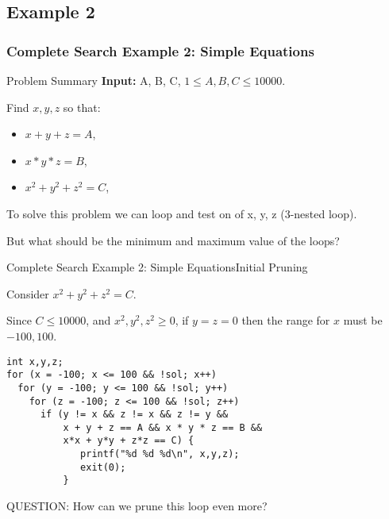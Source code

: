 \subsection{Example 2}
\begin{frame}
  \frametitle{Complete Search Example 2: Simple Equations}
  \begin{block}{Problem Summary}
    {\bf Input:} A, B, C, $1 \leq A,B,C \leq 10000$.\bigskip

    Find $x,y,z$ so that:
    \begin{itemize}
    \item $x+y+z=A$,
    \item $x*y*z=B$,
    \item $x^2+y^2+z^2=C$,
    \end{itemize}

    \bigskip
  \end{block}
  \bigskip

  To solve this problem we can loop and test on of x, y, z (3-nested loop).
  \bigskip

  But what should be the minimum and maximum value of the loops?
\end{frame}


\begin{frame}[fragile]{Complete Search Example 2: Simple Equations}{Initial Pruning}
  \begin{block}{}
    Consider $x^2 + y^2 + z^2 = C$.\medskip

    Since $C \leq 10000$, and $x^2,y^2,z^2 \geq 0$, if $y =
    z = 0$ then the range for $x$ must be $-100, 100$.
  \end{block}

{\smaller
\begin{verbatim}
int x,y,z;
for (x = -100; x <= 100 && !sol; x++)
  for (y = -100; y <= 100 && !sol; y++)
    for (z = -100; z <= 100 && !sol; z++)
      if (y != x && z != x && z != y &&
          x + y + z == A && x * y * z == B &&
          x*x + y*y + z*z == C) {
             printf("%d %d %d\n", x,y,z);
             exit(0);
          }
\end{verbatim}}

\begin{block}{}
  QUESTION: How can we prune this loop even more?
\end{block}
\end{frame}

